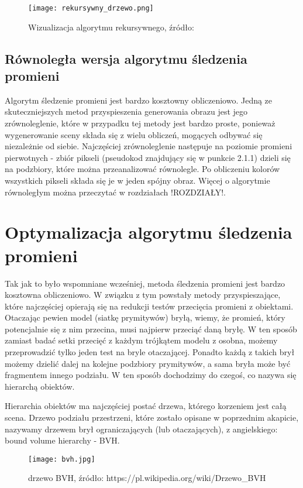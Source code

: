 \begin{figure}[h!]
\centering
  \caption{Wizualizacja algorytmu rekursywnego, źródło: \cite{scratch}}
  \texttt{[image: rekursywny\_drzewo.png]}
\end{figure}


\subsection{Równoległa wersja algorytmu śledzenia promieni}

Algorytm śledzenie promieni jest bardzo kosztowny obliczeniowo. Jedną ze skuteczniejszych metod przyspieszenia generowania obrazu jest jego zrównoleglenie, które w przypadku tej metody jest bardzo proste, ponieważ wygenerowanie sceny składa się z wielu obliczeń, mogących odbywać się niezależnie od siebie. Najczęściej zrównoleglenie następuje na poziomie promieni pierwotnych - zbiór pikseli (pseudokod znajdujący się w punkcie 2.1.1) dzieli się na podzbiory, które można przeanalizować równolegle. Po obliczeniu kolorów wszystkich pikseli składa się je w jeden spójny obraz. Więcej o algorytmie równoległym można przeczytać w rozdziałach !ROZDZIAŁY!.

\section{Optymalizacja algorytmu śledzenia promieni}

Tak jak to było wspomniane wcześniej, metoda śledzenia promieni jest bardzo kosztowna obliczeniowo. W związku z tym powstały metody przyspieszające, które najczęściej opierają się na redukcji testów przecięcia promieni z obiektami. Otaczając pewien model (siatkę prymitywów) bryłą, wiemy, że promień, który potencjalnie się z nim przecina, musi najpierw przeciąć daną bryłę. W ten sposób zamiast badać setki przecięć z każdym trójkątem modelu z osobna, możemy przeprowadzić tylko jeden test na bryle otaczającej. Ponadto każdą z takich brył możemy dzielić dalej na kolejne podzbiory prymitywów, a sama bryła może być fragmentem innego podziału. W ten sposób dochodzimy do czegoś, co nazywa się hierarchą obiektów.

Hierarchia obiektów ma najczęściej postać drzewa, którego korzeniem jest całą scena. Drzewo podziału przestrzeni, które zostało opisane w poprzednim akapicie, nazywamy drzewem brył ograniczających (lub otaczających), z angielskiego: bound volume hierarchy - BVH. 

\begin{figure}[h!]
\centering
  \caption{drzewo BVH, źródło: https://pl.wikipedia.org/wiki/Drzewo\_BVH}
  \texttt{[image: bvh.jpg]}
\end{figure}

